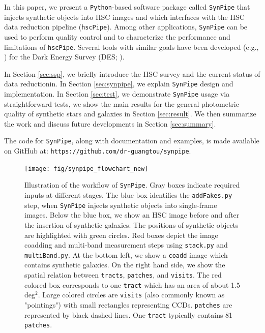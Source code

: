 \documentclass[useamsfonts]{pasj01}
\def\hscpipe{\texttt{hscPipe}}
\def\synpipe{\texttt{SynPipe}}
\def\coadd{\texttt{coadd}}
\begin{document}
    In this paper, we present a \texttt{Python}-based software package called 
    \synpipe{} that injects synthetic objects into HSC images and which interfaces with 
    the HSC data reduction pipeline (\hscpipe{}). 
    Among other applications, \synpipe{} can be used to perform quality control and 
    to characterize the performance and limitations of \hscpipe{}. 
    Several tools with similar goals have been developed (e.g., \citealt{Chang2015,
    Suchyta2016}) for the Dark Energy Survey (DES; \citealt{DES2005}).

    In Section \ref{sec:ssp}, we briefly introduce the HSC survey and the current status
    of data reductionin. 
    In Section \ref{sec:synpipe}, we explain \synpipe{} design and implementation.
    In Section \ref{sec:test}, we demonstrate \synpipe{} usage via straightforward
    tests, we show the main results for the general photometric quality of synthetic 
    stars and galaxies in Section \ref{sec:result}.
    We then summarize the work and discuss future developments in Section 
    \ref{sec:summary}.

    The code for \synpipe{}, along with documentation and examples, is made available
    on GitHub at: \texttt{https://github.com/dr-guangtou/synpipe}.
    

\begin{figure}
    \begin{center}
        \texttt{[image: fig/synpipe\_flowchart\_new]}
    \end{center}
    \caption{
        Illustration of the workflow of \synpipe{}.
        Gray boxes indicate required inputs at different stages.
        The blue box identifies the \texttt{addFakes.py} step, when \synpipe{} injects 
        synthetic objects into single-frame images. 
        Below the blue box, we show an HSC image before and after the insertion of 
        synthetic galaxies. 
        The positions of synthetic objects are highlighted with green circles. 
        Red boxes depict the image coadding and multi-band measurement steps
        using \texttt{stack.py} and \texttt{multiBand.py}. 
        At the bottom left, we show a \coadd{} image which contains synthetic galaxies. 
        On the right hand side, we show the spatial relation between \texttt{tracts},
        \texttt{patches}, and \texttt{visits}. 
        The red colored box corresponds to one \texttt{tract} which has an area of 
        about 1.5 deg$^2$. 
        Large colored circles are \texttt{visits} (also commonly known as "pointings") 
        with small rectangles representing CCDs. 
        \texttt{patches} are represented by black dashed lines. 
        One \texttt{tract} typically contains 81 \texttt{patches}.
        }
    \label{fig:flowchart}
\end{figure}
\end{document}
